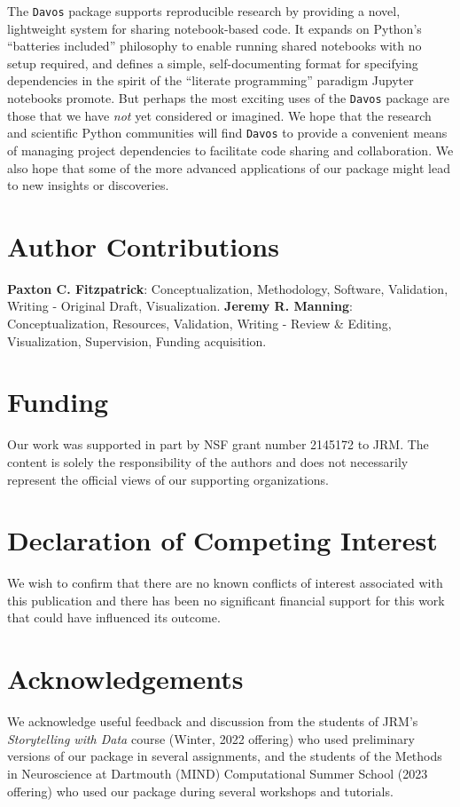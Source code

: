 \documentclass[preprint,12pt,a4paper]{elsarticle}
\begin{document}
The \texttt{Davos} package supports reproducible research by providing
a novel, lightweight system for sharing notebook-based code. It
expands on Python's ``batteries included'' philosophy to enable running shared
notebooks with no setup required, and defines a simple, self-documenting format for
specifying dependencies in the spirit of the ``literate programming'' paradigm Jupyter notebooks promote.
But perhaps the most exciting uses of the \texttt{Davos} package are those
that we have \textit{not} yet considered or imagined. We hope that the
research and scientific Python communities will find \texttt{Davos} to provide a convenient
means of managing project dependencies to facilitate code sharing and collaboration. We
also hope that some of the more advanced applications of our package
might lead to new insights or discoveries.


\section*{Author Contributions}

\textbf{Paxton C. Fitzpatrick}: Conceptualization, Methodology,
Software, Validation, Writing - Original Draft,
Visualization. \textbf{Jeremy R. Manning}: Conceptualization,
Resources, Validation, Writing - Review \& Editing, Visualization, Supervision,
Funding acquisition.

\section*{Funding}

Our work was supported in part by NSF grant number 2145172 to JRM\@.
The content is solely the responsibility of the authors and does not
necessarily represent the official views of our supporting
organizations.


\section*{Declaration of Competing Interest}

We wish to confirm that there are no known conflicts of interest
associated with this publication and there has been no significant
financial support for this work that could have influenced its
outcome.


\section*{Acknowledgements}

We acknowledge useful feedback and discussion from the students of
JRM's \textit{Storytelling with Data} course (Winter, 2022 offering)
who used preliminary versions of our package in several assignments,
and the students of the Methods in Neuroscience at Dartmouth (MIND)
Computational Summer School (2023 offering) who used our package
during several workshops and tutorials.




\end{document}

